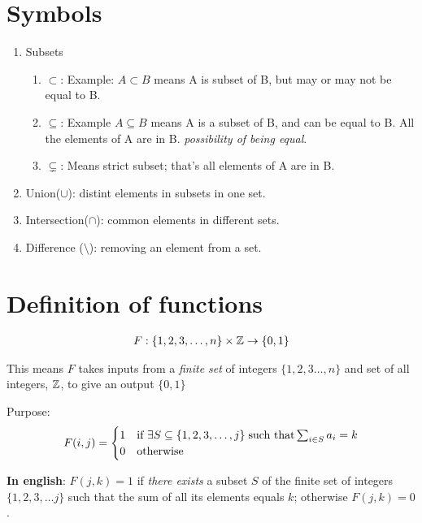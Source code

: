 \documentclass[11pt]{article}
\begin{document}

\section*{Symbols}
\begin{enumerate}
    \item Subsets
        \begin{enumerate}[label=\alph*]
            \item $\subset$: Example: $A \subset B$ means A is subset of B, but may or may not be equal to B.
            \item $\subseteq$: Example $A \subseteq B$ means A is a subset of B, and can be equal to B. All the elements of A are in B. \textit{possibility of being equal}.
            \item $\subsetneq$: Means strict subset; that's all elements of A are in B.
        \end{enumerate}
    \item Union($\cup$): distint elements in subsets in one set.
    \item Intersection($\cap$): common elements in different sets.
    \item Difference ($\setminus$): removing an element from a set.
\end{enumerate}
\section*{Definition of functions}
\begin{gather}
    F : \{1, 2, 3, \ldots, n\} \times \mathbb{Z} \rightarrow \{0, 1\}
\end{gather}

This means $F$ takes inputs from a \textit{finite set} of integers $\{1, 2, 3 \ldots, n\}$ and set of all integers, $\mathbb{Z}$, to give an output $\{0, 1\}$

Purpose:
\begin{gather}
    F(i, j) =
    \begin{cases}
        1 & \text{if } \exists S \subseteq \{1, 2, 3, \ldots, j\} \hspace{1.0mm} \text{such that} \sum_{i \in S} a_i = k \\
        0 & \text{otherwise}
    \end{cases}
\end{gather}

\textbf{In english}: $F(j, k) = 1$ if \textit{there exists} a subset $S$ of the finite set of integers $\{1, 2, 3, \ldots j\}$ such that the sum of all its elements equals $k$; otherwise $F(j, k) = 0$. \\
\end{document}
